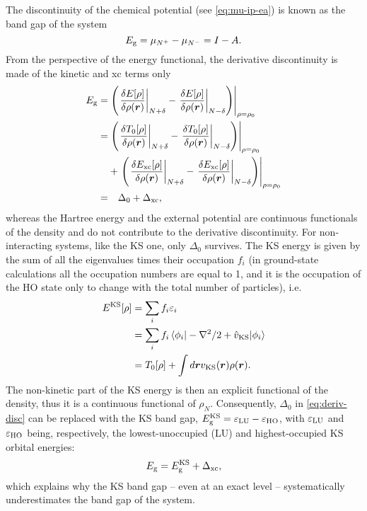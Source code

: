 The discontinuity of the chemical potential (see \cref{eq:mu-ip-ea}) is known as the band gap of the system
%
\begin{equation}
    E_{\rm g} = \mu_{N^+} - \mu_{N^-} = I - A .
    \label{eq:band-gap}
\end{equation}
%
From the perspective of the energy functional, the derivative discontinuity is made of the kinetic and xc terms only
%
\begin{equation}
    \begin{split}
    E_{\rm g} = &\left. \left( \left. \frac{\delta E[\rho]}{\delta \rho({\bm r})} \right|_{N+\delta} - \left. \frac{\delta E[\rho]}{\delta \rho({\bm r})} \right|_{N-\delta} \right) \right|_{\rho=\rho_0} \\
    = &\left. \left( \left. \frac{\delta T_0[\rho]}{\delta \rho({\bm r})} \right|_{N+\delta} - \left. \frac{\delta T_0[\rho]}{\delta \rho({\bm r})} \right|_{N-\delta} \right) \right|_{\rho=\rho_0} \\
    &+ \left. \left( \left. \frac{\delta E_{\rm xc}[\rho]}{\delta \rho({\bm r})} \right|_{N+\delta} - \left. \frac{\delta E_{\rm xc}[\rho]}{\delta \rho({\bm r})} \right|_{N-\delta} \right) \right|_{\rho=\rho_0} \\
    = &\quad \Delta_0 + \Delta_{\rm xc} ,
    \end{split}
    \label{eq:deriv-disc}
\end{equation}
%
whereas the Hartree energy and the external potential are continuous functionals of the density and do not contribute to the derivative discontinuity. For non-interacting systems, like the KS one, only $\Delta_0$ survives. The KS energy is given by the sum of all the eigenvalues times their occupation $f_i$ (in ground-state calculations all the occupation numbers are equal to 1, and it is the occupation of the HO state only to change with the total number of particles), i.e.
%
\begin{equation}
    \begin{split}
        E^{\rm KS}[\rho] &= \sum_i f_i \varepsilon_i \\
        &= \sum_i f_i \braket{\phi_i | -\nabla^2/2 + \hat{v}_{\rm KS} | \phi_i} \\
        &= T_0[\rho] + \int d{\bm r} v_{\rm KS}({\bm r}) \rho({\bm r}) .
    \end{split}
    \label{eq:ks-energy}
\end{equation}
%
The non-kinetic part of the KS energy is then an explicit functional of the density, thus it is a continuous functional of $\rho_N$. Consequently, $\Delta_0$ in \cref{eq:deriv-disc} can be replaced with the KS band gap, $E_{\rm g}^{\rm KS} = \varepsilon_{\rm LU} - \varepsilon_{\rm HO}$, with $\varepsilon_{\rm LU}$ and $\varepsilon_{\rm HO}$ being, respectively, the lowest-unoccupied (LU) and highest-occupied KS orbital energies:
%
\begin{equation}
    E_{\rm g} = E_{\rm g}^{\rm KS} + \Delta_{\rm xc} ,
    \label{eq:band-gap-der-disc}
\end{equation}
%
which explains why the KS band gap -- even at an exact level -- systematically underestimates the band gap of the system.

